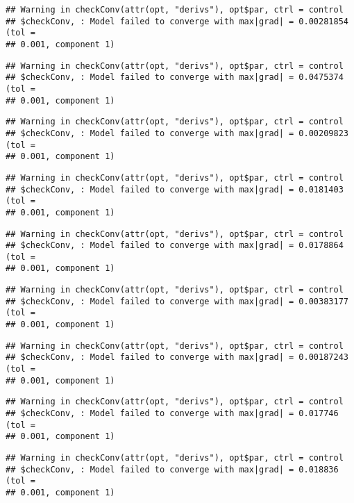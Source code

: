 \documentclass[]{article}
\begin{document}
\begin{verbatim}
## Warning in checkConv(attr(opt, "derivs"), opt$par, ctrl = control
## $checkConv, : Model failed to converge with max|grad| = 0.00281854 (tol =
## 0.001, component 1)
\end{verbatim}

\begin{verbatim}
## Warning in checkConv(attr(opt, "derivs"), opt$par, ctrl = control
## $checkConv, : Model failed to converge with max|grad| = 0.0475374 (tol =
## 0.001, component 1)
\end{verbatim}

\begin{verbatim}
## Warning in checkConv(attr(opt, "derivs"), opt$par, ctrl = control
## $checkConv, : Model failed to converge with max|grad| = 0.00209823 (tol =
## 0.001, component 1)
\end{verbatim}

\begin{verbatim}
## Warning in checkConv(attr(opt, "derivs"), opt$par, ctrl = control
## $checkConv, : Model failed to converge with max|grad| = 0.0181403 (tol =
## 0.001, component 1)
\end{verbatim}

\begin{verbatim}
## Warning in checkConv(attr(opt, "derivs"), opt$par, ctrl = control
## $checkConv, : Model failed to converge with max|grad| = 0.0178864 (tol =
## 0.001, component 1)
\end{verbatim}

\begin{verbatim}
## Warning in checkConv(attr(opt, "derivs"), opt$par, ctrl = control
## $checkConv, : Model failed to converge with max|grad| = 0.00383177 (tol =
## 0.001, component 1)
\end{verbatim}

\begin{verbatim}
## Warning in checkConv(attr(opt, "derivs"), opt$par, ctrl = control
## $checkConv, : Model failed to converge with max|grad| = 0.00187243 (tol =
## 0.001, component 1)
\end{verbatim}

\begin{verbatim}
## Warning in checkConv(attr(opt, "derivs"), opt$par, ctrl = control
## $checkConv, : Model failed to converge with max|grad| = 0.017746 (tol =
## 0.001, component 1)
\end{verbatim}

\begin{verbatim}
## Warning in checkConv(attr(opt, "derivs"), opt$par, ctrl = control
## $checkConv, : Model failed to converge with max|grad| = 0.018836 (tol =
## 0.001, component 1)
\end{verbatim}
\end{document}
